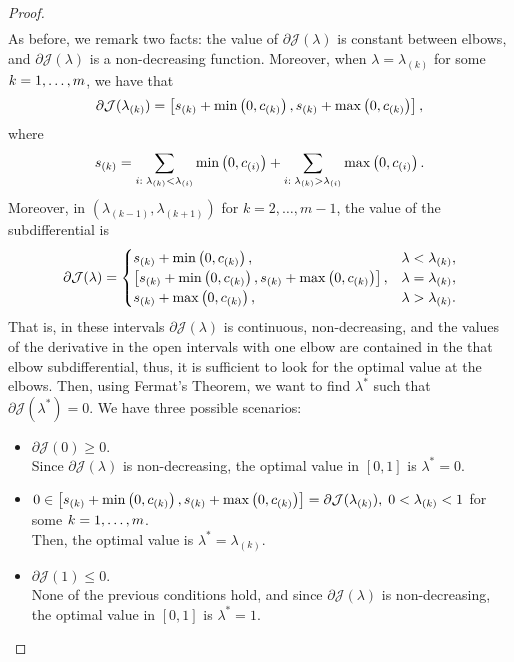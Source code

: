 \begin{proof}
\begin{equation}
\begin{aligned}
        \end{aligned}        
    \end{equation}
    As before, we remark two facts: the value of $\partial \mathcal{J}(\lambda)$ is constant between elbows, and $\partial \mathcal{J}(\lambda)$ is a non-decreasing function.
    Moreover, when $\lambda = \lambda_{(k)}$ for some $k=1, \ldots, m$, we have that
    \begin{equation}
        \nonumber
        \partial \mathcal{J}(\lambda_{(k)}) = \left[ s_{(k)} + \min\left(0, c_{(k)}\right), s_{(k)} + \max\left(0, c_{(k)}\right)  \right] ,
    \end{equation}
    where $$s_{(k)} = \sum_{i: \; \lambda_{(k)} < \lambda_{(i)}} \min\left(0, c_{(i)}\right) + \sum_{i: \; \lambda_{(k)} > \lambda_{(i)}} \max\left(0, c_{(i)}\right).$$
    Moreover, in $(\lambda_{(k-1)}, \lambda_{(k+1)})$ for $k=2, \ldots, m-1$, the value of the subdifferential is
    \begin{equation}
        \nonumber
        \partial \mathcal{J}(\lambda) = \begin{cases}
            s_{(k)} + \min\left(0, c_{(k)}\right),& \lambda < \lambda_{(k)}, \\
            \left[ s_{(k)} + \min\left(0, c_{(k)}\right), s_{(k)} + \max\left(0, c_{(k)}\right)   \right],& \lambda = \lambda_{(k)}, \\
            s_{(k)} + \max\left(0, c_{(k)}\right),& \lambda > \lambda_{(k)} .
        \end{cases}
    \end{equation}
    That is, in these intervals $\partial \mathcal{J}(\lambda)$ is continuous, non-decreasing, and the values of the derivative in the open intervals with one elbow are contained in the that elbow subdifferential, thus, it is sufficient to look for the optimal value at the elbows.
    Then, using Fermat's Theorem, we want to find $\lambda^*$ such that $\partial \mathcal{J}(\lambda^*) = 0$. We have three possible scenarios:
    \begin{itemize}
        \item $\partial \mathcal{J}(0) \geq 0.$ 
        \\Since $\partial \mathcal{J}(\lambda)$ is non-decreasing, the optimal value in $[0, 1]$ is $\lambda^* = 0$.
        \item $0 \in \left[ s_{(k)} + \min\left(0, c_{(k)}\right), s_{(k)} + \max\left(0, c_{(k)}\right)   \right] = \partial \mathcal{J}(\lambda_{(k)}), \; 0 < \lambda_{(k)} < 1$ for some $k=1, \ldots, m$. 
        \\Then, the optimal value is $\lambda^*=\lambda_{(k)}$.
        \item $\partial \mathcal{J}(1) \leq 0$. 
        \\None of the previous conditions hold, and since $\partial \mathcal{J}(\lambda)$ is non-decreasing, the optimal value in $[0, 1]$ is $\lambda^* = 1$.
    \end{itemize}
\end{proof}
